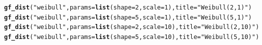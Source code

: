 \documentclass[twoside]{book}\usepackage[]{graphicx}\usepackage[]{xcolor}
\makeatletter
\newcommand{\hlnum}[1]{\textcolor[rgb]{0.686,0.059,0.569}{#1}}%
\newcommand{\hlstr}[1]{\textcolor[rgb]{0.192,0.494,0.8}{#1}}%
\newcommand{\hlstd}[1]{\textcolor[rgb]{0.345,0.345,0.345}{#1}}%
\newcommand{\hlkwc}[1]{\textcolor[rgb]{0.333,0.667,0.333}{#1}}%
\newcommand{\hlkwd}[1]{\textcolor[rgb]{0.737,0.353,0.396}{\textbf{#1}}}%
\newenvironment{kframe}{%
 \def\at@end@of@kframe{}%
 \ifinner\ifhmode%
  \def\at@end@of@kframe{\end{minipage}}%
  \begin{minipage}{\columnwidth}%
 \fi\fi%
 \def\FrameCommand##1{\hskip\@totalleftmargin \hskip-\fboxsep
 \colorbox{shadecolor}{##1}\hskip-\fboxsep
     \hskip-\linewidth \hskip-\@totalleftmargin \hskip\columnwidth}%
 \MakeFramed {\advance\hsize-\width
   \@totalleftmargin\z@ \linewidth\hsize
   \@setminipage}}%
 {\par\unskip\endMakeFramed%
 \at@end@of@kframe}
\newenvironment{knitrout}{}{} %
\makeatother
\begin{document}
\begin{knitrout}
{}



\end{knitrout}

\begin{knitrout}
\color{fgcolor}\begin{kframe}
\begin{alltt}
\hlkwd{gf_dist}\hlstd{(}\hlstr{"weibull"}\hlstd{,} \hlkwc{params} \hlstd{=} \hlkwd{list}\hlstd{(}\hlkwc{shape} \hlstd{=} \hlnum{2}\hlstd{,} \hlkwc{scale} \hlstd{=} \hlnum{1}\hlstd{),}\hlkwc{title} \hlstd{=} \hlstr{"Weibull(2,1)"}\hlstd{)}
\hlkwd{gf_dist}\hlstd{(}\hlstr{"weibull"}\hlstd{,} \hlkwc{params} \hlstd{=} \hlkwd{list}\hlstd{(}\hlkwc{shape} \hlstd{=} \hlnum{5}\hlstd{,} \hlkwc{scale} \hlstd{=} \hlnum{1}\hlstd{),}\hlkwc{title} \hlstd{=} \hlstr{"Weibull(5,1)"}\hlstd{)}
\hlkwd{gf_dist}\hlstd{(}\hlstr{"weibull"}\hlstd{,} \hlkwc{params} \hlstd{=} \hlkwd{list}\hlstd{(}\hlkwc{shape} \hlstd{=} \hlnum{2}\hlstd{,} \hlkwc{scale} \hlstd{=} \hlnum{10}\hlstd{),}\hlkwc{title} \hlstd{=} \hlstr{"Weibull(2,10)"}\hlstd{)}
\hlkwd{gf_dist}\hlstd{(}\hlstr{"weibull"}\hlstd{,} \hlkwc{params} \hlstd{=} \hlkwd{list}\hlstd{(}\hlkwc{shape} \hlstd{=} \hlnum{5}\hlstd{,} \hlkwc{scale} \hlstd{=} \hlnum{10}\hlstd{),}\hlkwc{title} \hlstd{=} \hlstr{"Weibull(5,10)"}\hlstd{)}
\end{alltt}
\end{kframe}


\end{knitrout}
\end{document}
